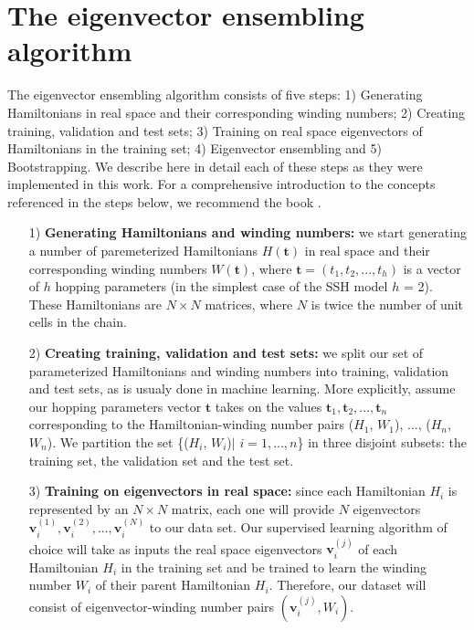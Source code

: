 \documentclass[10pt]{revtex4-1}
\begin{document}
\section{The eigenvector ensembling algorithm}
\label{the_eigenvector_ensembling_algorithm}
The eigenvector ensembling algorithm consists of five steps: 1) Generating Hamiltonians in real space and their corresponding winding numbers; 2) Creating training, validation and test sets; 3) Training on real space eigenvectors of Hamiltonians in the training set; 4) Eigenvector ensembling and 5) Bootstrapping. We describe here in detail each of these steps as they were implemented in this work. For a comprehensive introduction to the concepts referenced in the steps below, we recommend the book \cite{friedman2001elements}.    
\vspace{.3cm}
\begin{enumerate}%
\item[1)] \textbf{Generating Hamiltonians and winding numbers:} we start generating a number of paremeterized Hamiltonians $H(\mathbf{t})$ in real space and their corresponding winding numbers $W(\mathbf{t})$, where $\mathbf{t} = (t_1, t_2,...,t_h)$ is a vector of $h$ hopping parameters (in the simplest case of the SSH model $h$ = 2). These Hamiltonians are $N\times N$ matrices, where $N$ is twice the number of unit cells in the chain.
\item[2)] \textbf{Creating training, validation and test sets:} we split our set of parameterized Hamiltonians and winding numbers into training, validation and test sets, as is usualy done in machine learning. More explicitly, assume our hopping parameters vector $\mathbf{t}$ takes on the values $\mathbf{t}_1, \mathbf{t}_2, ..., \mathbf{t}_n$ corresponding to the Hamiltonian-winding number pairs ($H_1$, $W_1$), ..., ($H_n$, $W_n$). We partition the set \{($H_i$, $W_i$)$\mid$ $i=1,...,n$\} in three disjoint subsets: the training set, the validation set and the test set.
\item[3)] \textbf{Training on eigenvectors in real space:} since each Hamiltonian $H_i$ is represented by an $N\times N$ matrix, each one will provide $N$ eigenvectors $\mathbf{v}_i^{(1)}, \mathbf{v}_i^{(2)},...,\mathbf{v}_i^{(N)}$ to our data set. Our supervised learning algorithm of choice will take as inputs the real space eigenvectors $\mathbf{v}^{(j)}_i$ of each Hamiltonian $H_i$ in the training set and be trained to learn the winding number $W_i$ of their parent Hamiltonian $H_i$. Therefore, our dataset will consist of eigenvector-winding number pairs $(\mathbf{v}_i^{(j)}, W_i)$.

\end{enumerate}
\end{document}
